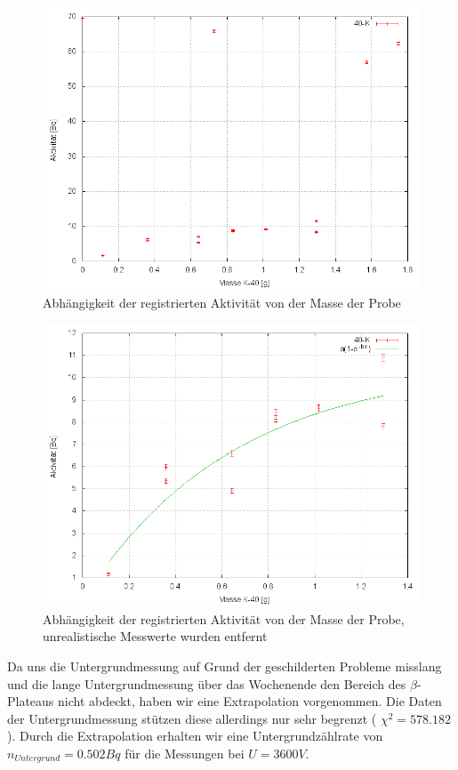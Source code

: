 \begin{figure}
 \centering \includegraphics[width = 0.99\linewidth]{Messwerte/plots/K40_massenabh.png}
 \caption{Abhängigkeit der registrierten Aktivität von der Masse der Probe}
\end{figure}

\begin{figure}
 \centering \includegraphics[width = 0.99\linewidth]{Messwerte/plots/K40_massenabh_bereinigt.png}
 \caption{Abhängigkeit der registrierten Aktivität von der Masse der Probe, unrealistische Messwerte wurden entfernt}
\end{figure}

Da uns die Untergrundmessung auf Grund der geschilderten Probleme misslang und die lange Untergrundmessung über das Wochenende den Bereich des $\beta$-Plateaus nicht abdeckt, haben wir eine Extrapolation vorgenommen. Die Daten der Untergrundmessung stützen diese allerdings nur sehr begrenzt ( $\chi^2 = 578.182$). Durch die Extrapolation erhalten wir eine Untergrundzählrate von $ n_{Untergrund} = 0.502 Bq$ für die Messungen bei $U = 3600V$.

